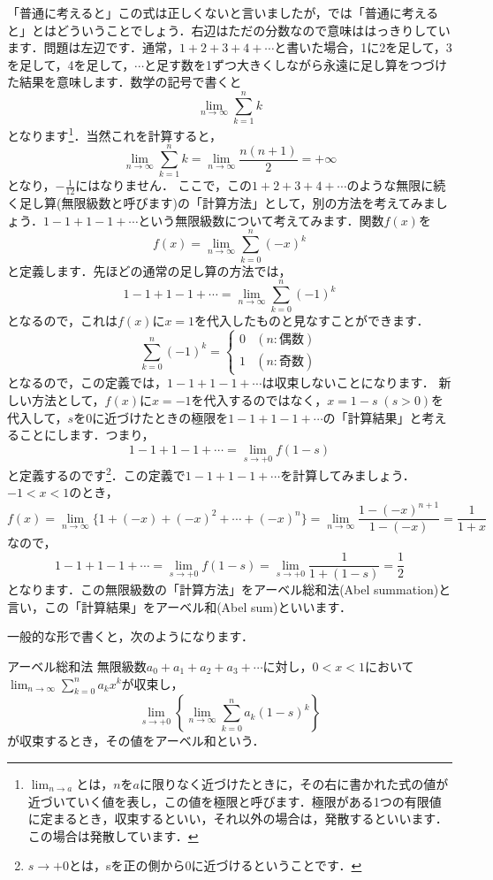 \documentclass[./main]{subfile}
\begin{document}
「普通に考えると」この式は正しくないと言いましたが，では「普通に考えると」とはどういうことでしょう．右辺はただの分数なので意味ははっきりしています．問題は左辺です．通常，$1+2+3+4+\cdots$と書いた場合，1に2を足して，3を足して，4を足して，$\cdots$と足す数を1ずつ大きくしながら永遠に足し算をつづけた結果を意味します．数学の記号で書くと
\[
\lim_{n\to\infty}\sum_{k=1}^{n}k
\]
となります\footnote{$\lim_{n\to a}$とは，$n$を$a$に限りなく近づけたときに，その右に書かれた式の値が近づいていく値を表し，この値を極限と呼びます．極限がある1つの有限値に定まるとき，収束するといい，それ以外の場合は，発散するといいます．この場合は発散しています．}．当然これを計算すると，
\[
\lim_{n\to\infty}\sum_{k=1}^{n}k=\lim_{n\to\infty}\frac{n(n+1)}{2}=+\infty
\]
となり，$-\frac{1}{12}$にはなりません．
ここで，この$1+2+3+4+\cdots$のような無限に続く足し算(無限級数と呼びます)の「計算方法」として，別の方法を考えてみましょう．$1-1+1-1+\cdots$という無限級数について考えてみます．関数$f(x)$を
\[
f(x)=\lim_{n\to\infty}\sum_{k=0}^{n}(-x)^{k}
\]
と定義します．先ほどの通常の足し算の方法では，
\[
1-1+1-1+\cdots=\lim_{n\to\infty}\sum_{k=0}^{n}(-1)^{k}
\]
となるので，これは$f(x)$に$x=1$を代入したものと見なすことができます．
\[
\sum_{k=0}^{n}(-1)^{k}=
\begin{cases}
0&(n:\text{偶数})\\
1&(n:\text{奇数})
\end{cases}
\]
となるので，この定義では，$1-1+1-1+\cdots$は収束しないことになります．
新しい方法として，$f(x)$に$x=-1$を代入するのではなく，$x=1-s\;(s>0)$を代入して，$s$を0に近づけたときの極限を$1-1+1-1+\cdots$の「計算結果」と考えることにします．つまり，
\[
1-1+1-1+\cdots=\lim_{s\to +0}f(1-s)
\]
と定義するのです\footnote{$s\to +0$とは，sを正の側から0に近づけるということです．}．この定義で$1-1+1-1+\cdots$を計算してみましょう．$-1<x<1$のとき，
\[
f(x)=\lim_{n\to\infty}\{1+(-x)+(-x)^2+\cdots+(-x)^n\}=\lim_{n\to\infty}\frac{1-(-x)^{n+1}}{1-(-x)}=\frac{1}{1+x}
\]
なので，
\[
1-1+1-1+\cdots=\lim_{s\to +0}f(1-s)=\lim_{s\to +0}\frac{1}{1+(1-s)}=\frac{1}{2}
\]
となります．この無限級数の「計算方法」をアーベル総和法(Abel summation)と言い，この「計算結果」をアーベル和(Abel sum)といいます．

一般的な形で書くと，次のようになります．
\begin{itembox}[l]{アーベル総和法}
無限級数$a_0+a_1+a_2+a_3+\cdots$に対し，$0<x<1$において$\lim_{n\to\infty}\sum_{k=0}^na_kx^k$が収束し\footnotemark{}，
\[
\lim_{s\to+0}\left\{\lim_{n\to\infty}\sum_{k=0}^na_k(1-s)^k\right\}
\]
が収束するとき，その値をアーベル和という．
\end{itembox}
\addtocounter{footnote}{-1}
\end{document}
